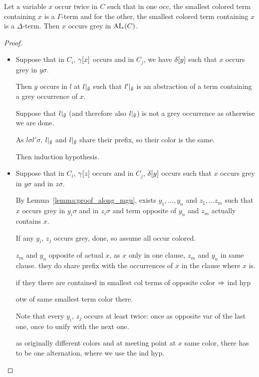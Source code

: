\documentclass[,%
	paper=a4,%
	DIV11, %
	twoside=false,%
	liststotoc,
	bibtotoc,
	draft=false,%
	numbers=noendperiod
]{scrartcl}
\begin{document}
\begin{clemma}
	\label{lemma:smallest_colored_container}
	Let a variable $x$ occur twice in $C$ such that in one occ, the smallest colored term containing $x$ is a $\Gamma$-term and for the other, the smallest colored term containing $x$ is a $\Delta$-term.
	Then $x$ occurs grey in $\operatorname{AI}_\mathrm{*}(C)$.
\end{clemma}
\begin{proof}
	~
	\begin{itemize}
		\item
			Suppose that in $C_i$, $\gamma[x]$ occurs and in $C_j$, we have $\delta[y]$ such that $x$ occurs grey in $y\sigma$.

			Then $y$ occurs in $l$ at $l|_{\bm\hat y}$ such that $l'|_{\bm\hat y}$ is an abstraction of a term containing a grey occurrence of $x$.

			Suppose that $l|_{\bm\hat y}$ (and therefore also $l|_{\bm\hat y}$) is not a grey occurrence as otherwise we are done. 

			As $l\sigma l'\sigma $, $l|_{\bm\hat y}$ and $l|_{\bm\hat y}$ share their prefix, so their color is the same.

			Then induction hypothesis.

		\item 
			Suppose that in $C_i$, $\gamma[z]$ occurs and in $C_j$, $\delta[y]$ occurs such that $x$ occurs grey in $y\sigma$ and in $z\sigma$.

			By Lemma~\ref{lemma:proof_along_mgu}, exists $y_1, \dots, y_n$ and $z_1, \dots z_m$ such that $x$ occurs grey in $y_i\sigma$ and in $z_i\sigma$ and term opposite of $y_n$ and $z_m$ actually contains $x$.


			If any $y_i$, $z_j$ occurs grey, done, so assume all occur colored.

			$z_m$ and $y_n$ opposite of actual $x$, as $x$ only in one clause, $z_m$ and $y_n$ in same clause. 
			they do share prefix with the occurrences of $x$ in the clause where $x$ is.

			if they there are contained in smallest col terms of opposite color $\Rightarrow$ ind hyp

			otw of same smallest term color there.

			Note that every $y_i$, $z_j$ occurs at least twice: once as opposite var of the last one, once to unify with the next one.

			as originally different colors and at meeting point at $x$ same color, there has to be one alternation, where we use the ind hyp.



\end{itemize}
\end{proof}
\end{document}
